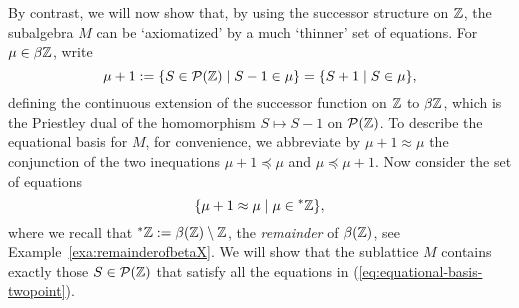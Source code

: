 \begin{example}
By contrast, we will now show that, by using the successor structure on $\mathbb{Z}$, the subalgebra $M$ can be `axiomatized' by a much `thinner' set of equations. For $\mu \in \beta\mathbb{Z}$, write 
\[
\mu+1:=\{S\in\mathcal{P}(\mathbb{Z})\mid S-1\in\mu\}=\{S+1\mid S\in\mu\},
\]
defining the continuous extension of the successor function on $\mathbb{Z}$ to $\beta\mathbb{Z}$, which is  the Priestley dual of the homomorphism $S\mapsto S-1$ on $\mathcal{P}(\mathbb{Z})$. 
To describe the equational basis for $M$, for convenience, we abbreviate by $\mu+1 \approx \mu$ the conjunction of the two inequations $\mu+1 \preceq \mu$ and $\mu \preceq \mu+1$. Now consider the set of equations 
\begin{equation}\label{eq:equational-basis-twopoint}
\{\mu+1\approx\mu \mid \mu\in{}^*\mathbb{Z}\},
\end{equation}
where we recall that ${}^*\mathbb{Z} := \beta(\mathbb{Z}) \setminus \mathbb{Z}$, the \emph{remainder} of $\beta(\mathbb{Z})$, see Example~\ref{exa:remainderofbetaX}. 
We will show that the sublattice $M$ contains exactly those $S \in \mathcal{P}(\mathbb{Z})$ that satisfy all the equations in (\ref{eq:equational-basis-twopoint}). 


\end{example}
